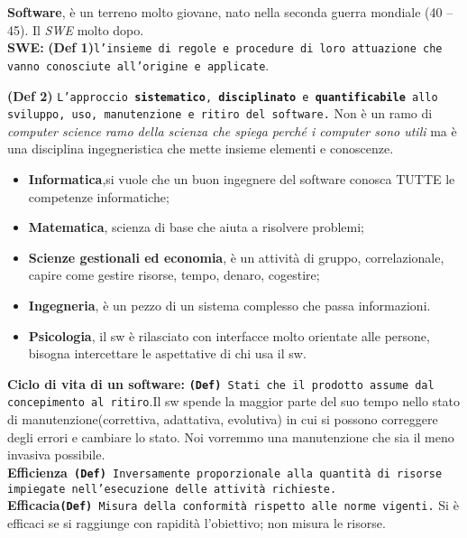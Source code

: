 \textbf{Software}, è un terreno molto giovane, nato nella seconda guerra mondiale (40 – 45). Il \textit{SWE} molto dopo.\\
\textbf{SWE:} \textbf{(Def 1)}\texttt{l'insieme di regole e procedure di loro attuazione che vanno conosciute all'origine e applicate}.\\
{\textbf{(Def 2)} \texttt{L'approccio \textbf{sistematico}, \textbf{disciplinato} e \textbf{quantificabile} allo sviluppo, uso, manutenzione e ritiro del software.} Non è un ramo di \textit{computer science} \textit{ramo della scienza che spiega perché i computer sono utili} ma è una disciplina ingegneristica che mette insieme elementi e conoscenze.

\begin{itemize}

	\item \textbf{Informatica},si vuole che un buon ingegnere del software conosca TUTTE le competenze informatiche;
	\item \textbf{Matematica}, scienza di base che aiuta a risolvere problemi;
	\item \textbf{Scienze gestionali ed economia}, è un attività di gruppo, correlazionale, capire come gestire risorse, tempo, denaro, cogestire;
	\item \textbf{Ingegneria}, è un pezzo di un sistema complesso che passa informazioni.
	\item \textbf{Psicologia}, il sw è rilasciato con interfacce molto orientate alle persone, bisogna intercettare le aspettative di chi usa il sw.

\end{itemize}

\textbf{Ciclo di vita di un software:} \texttt{\textbf{(Def)} Stati che il prodotto assume dal concepimento al ritiro}.Il sw spende la maggior parte del suo tempo nello stato di manutenzione(correttiva, adattativa, evolutiva) in cui si possono correggere degli errori e cambiare lo stato. Noi vorremmo una manutenzione che sia il meno invasiva possibile.\\

\textbf{Efficienza}\texttt{ \textbf{(Def)} Inversamente proporzionale alla quantità di risorse impiegate nell'esecuzione delle attività richieste.}	\\

\textbf{Efficacia}\texttt{\textbf{(Def)} Misura della conformità rispetto alle norme vigenti.} Si è efficaci se si raggiunge con rapidità l'obiettivo; non misura le risorse.

}
